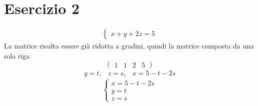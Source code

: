 \section{Esercizio 2}
\label{sec:esercizio2}

\begin{eqnarray*}
  \begin{cases}
    x+y+2z=5
  \end{cases}
\end{eqnarray*}
La matrice risulta essere già ridotta a gradini, quindi la matrice composta da una sola riga
\begin{equation*}
  (\begin{array}{ccc|c}
    1&1&2&5
  \end{array})
\end{equation*}
\begin{eqnarray*}
  y=t, & z=s, & x=5-t-2s
\end{eqnarray*}
\begin{equation*}
  \begin{cases}
    x=5-t-2s\\
    y=t\\
    z=s
  \end{cases}
\end{equation*}

